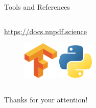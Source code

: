 \documentclass[9pt]{beamer}
\begin{document}
\begin{frame}{Tools and References}
\begin{columns}
\begin{column}{0.5\textwidth}
            \hspace*{15pt}\newline
            \hspace*{15pt}\url{https://docs.nnpdf.science}

            \vspace*{10pt}
            \begin{figure}
                \centering
                \includegraphics[width=0.15\textwidth]{tensorflow}
                \hspace*{0.25\textwidth}
                \includegraphics[width=0.15\textwidth]{python}
            \end{figure}
        \end{column}
    \end{columns}
\end{frame}

\begin{frame}[standout]
    Thanks for your attention!
\end{frame}

\appendix
\end{document}
